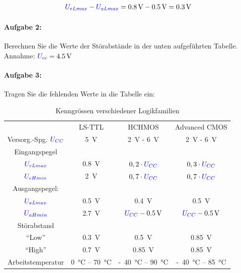 \documentclass[a4paper,titlepage,parskip]{scrreprt}
\newcommand{\spannung}[1]{\textcolor{blue}{#1}}
\begin{document}
        \begin{align*}
          \spannung{U_{eLmax}} - \spannung{U_{aLmax}} = \SI{0,8}{\volt} - \SI{0,5}{\volt} = \SI{0,3}{\volt}
        \end{align*}

      \paragraph{Aufgabe 2:} Berechnen Sie die Werte der Störabstände in der unten aufgeführten Tabelle.\\
        Annahme: $\spannung{U_{cc}} = \SI{4,5}{\volt}$

      \paragraph{Aufgabe 3:} Tragen Sie die fehlenden Werte in die Tabelle ein:

        \begin{center}
          \begin{table}[!hbtp]
            \caption{Kenngrössen verschiedener Logikfamilien}
              \label{tbl:Kenngroessen}
              \renewcommand{\arraystretch}{1.3}
              \begin{center}
                \begin{tabular}{c| ccc}
                  & LS-TTL & HCHMOS & Advanced CMOS\\
                  Versorg.-Spg. $\spannung{U_{CC}}$ & \SI{5}{\volt} & \SI{2}{\volt} - \SI{6}{\volt} & \SI{2}{\volt} - \SI{6}{\volt}\\ \hline
                  Eingangspegel &&&\\
                  $\spannung{U_{eLmax}}$&\SI{0,8}{\volt} & $ 0,2 \cdot \spannung{U_{CC}}$ &$ 0,3 \cdot \spannung{U_{CC}}$ \\
                  $\spannung{U_{eHmin}}$&\SI{2}{\volt} &$ 0,7 \cdot \spannung{U_{CC}}$ &$ 0,7 \cdot \spannung{U_{CC}}$ \\
                  Ausgangspegel:&&& \\
                  $\spannung{U_{aLmax}}$&\SI{0,5}{\volt} &\SI{0,4}{\volt} &\SI{0,5}{\volt} \\
                  $\spannung{U_{aHmin}}$&\SI{2,7}{\volt} &$\spannung{U_{CC}} - \SI{0,5}{\volt}$ &$\spannung{U_{CC}} - \SI{0,5}{\volt}$\\ \hline
                  Störabstand &&&\\
                  "`Low"' &\SI{0,3}{\volt} &\SI{0,5}{\volt} &\SI{0,85}{\volt} \\
                  "`High"' &\SI{0,7}{\volt} &\SI{0,85}{\volt} & \SI{0,85}{\volt}\\ \hline
                  Arbeitstemperatur & \SI{0}{\degreeCelsius} -- \SI{70}{\degreeCelsius} & \SI{40}[-]{\degreeCelsius} -- \SI{90}{\degreeCelsius} & \SI{40}[-]{\degreeCelsius} -- \SI{85}{\degreeCelsius}
                \end{tabular}
              \end{center}
          \end{table}
        \end{center}
\end{document}
